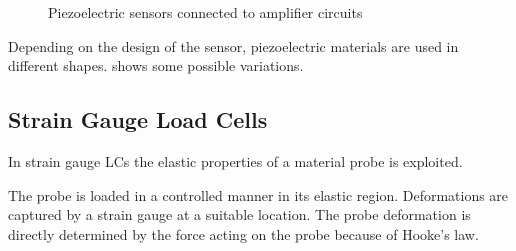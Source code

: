 \begin{figure}[!htb]
  \centering
  \hspace{4em}
  \caption[Piezoelectric sensors in amplifier circuits]{Piezoelectric sensors connected to amplifier circuits~\cite{webster2018measurement}%
    \label{fig:piezo_ampcirc}}
\end{figure}

Depending on the design of the sensor, piezoelectric materials are used in different shapes.  shows some possible variations.


\subsection{Strain Gauge Load Cells}

In strain gauge \ac{LC}s the elastic properties of a material probe is exploited.

The probe is loaded in a controlled manner in its elastic region. Deformations are captured by a strain gauge at a suitable location. The probe deformation is directly determined by the force acting on the probe because of Hooke's law.

